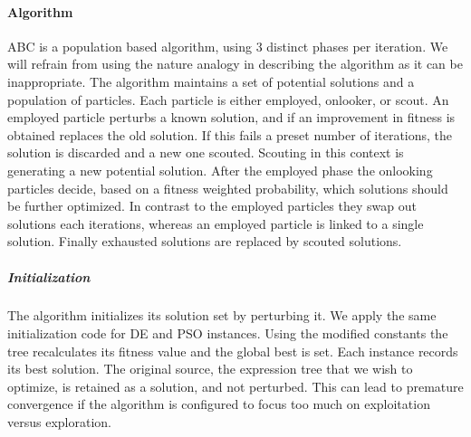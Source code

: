 \paragraph{Algorithm}
ABC is a population based algorithm, using 3 distinct phases per iteration. We will refrain from using the nature analogy in describing the algorithm as it can be inappropriate. The algorithm maintains a set of potential solutions and a population of particles. Each particle is either employed, onlooker, or scout. An employed particle perturbs a known solution, and if an improvement in fitness is obtained replaces the old solution. If this fails a preset number of iterations, the solution is discarded and a new one scouted. Scouting in this context is generating a new potential solution. After the employed phase the onlooking particles decide, based on a fitness weighted probability, which solutions should be further optimized. In contrast to the employed particles they swap out solutions each iterations, whereas an employed particle is linked to a single solution. Finally exhausted solutions are replaced by scouted solutions.
\subparagraph{Initialization}
The algorithm initializes its solution set by perturbing it. We apply the same initialization code for DE and PSO instances. Using the modified constants the tree recalculates its fitness value and the global best is set. Each instance records its best solution.
The original source, the expression tree that we wish to optimize, is retained as a solution, and not perturbed. This can lead to premature convergence if the algorithm is configured to focus too much on exploitation versus exploration.
 
